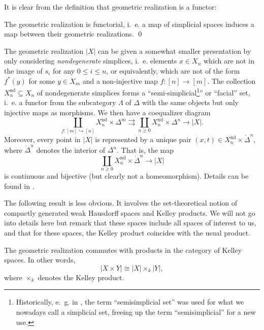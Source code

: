 \documentclass[a4paper,openany]{scrbook}
\begin{document}
It is clear from the definition that geometric realization is a functor:

\begin{lemma}
The geometric realization is functorial, i.~e. a map of simplicial spaces induces a map between their geometric realizations. \qed
\end{lemma}

The geometric realization $|X|$ can be given a somewhat smaller presentation by only considering \emph{nondegenerate} simplices, i.~e. elements $x \in X_n$ which are not in the image of $s_i$ for any $0 \leq i \leq n$, or equivalently, which are not of the form $f^*(y)$ for some $y \in X_m$ and a non-injective map $f\colon [n] \to [m]$. The collection $X^{\operatorname{nd}}_n \subseteq X_n$ of nondegenerate simplices forms a ``semi-simplicial\footnote{Historically, e.~g. in \cite{milnor:57}, the term ``semisimplicial set'' was used for what we nowadays call a simplicial set, freeing up the term ``semisimplicial'' for a new use.}'' or ``facial'' set, i.~e. a functor from the subcategory $\Lambda$ of $\Delta$ with the same objects but only injective maps as morphisms. We then have a coequalizer diagram
\begin{equation}\label{eq:realizationwithnondegenerates}
\coprod_{f\colon [m] \hookrightarrow [n]} X^{\operatorname{nd}}_n \times \Delta^m \rightrightarrows \coprod_{n \geq 0} X^{\operatorname{nd}}_n \times \Delta^n \to |X|.
\end{equation}
Moreover, every point in $|X|$ is represented by a unique pair $(x,t) \in X^{\operatorname{nd}}_n \times \mathring\Delta^n$, where $\mathring\Delta^n$ denotes the interior of $\Delta^n$. That is, the map
\[
\coprod_{n \geq 0} X^{\operatorname{nd}}_n \times \mathring \Delta^n \to |X|
\]
is continuous and bijective (but clearly not a homeomorphism). Details can be found in \cite{milnor:57}.

The following result is less obvious. It involves the set-theoretical notion of compactly generated weak Hausdorff spaces and Kelley products. We will not go into details here but remark that these spaces include all spaces of interest to us, and that for these spaces, the Kelley product coincides with the usual product. 
\begin{thm} \label{thm:geomrealizationandproduct}
The geometric realization commutes with products in the category of Kelley spaces. In other words,
\[
| X \times Y | \cong |X| \times_k |Y|,
\]
where $\times_k$ denotes the Kelley product.
\end{thm}
\end{document}
